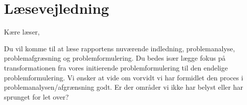 \section{Læsevejledning}
Kære læser,

Du vil komme til at læse rapportens nuværende indledning, problemanalyse, problemafgræsning og problemformulering. Du bedes især lægge fokus på transformationen fra vores initierende problemformulering til den endelige problemformulering. Vi ønsker at vide om vorvidt vi har formidlet den proces i problemanalysen/afgrænsning godt. Er der områder vi ikke har belyst eller har sprunget for let over?
\newpage